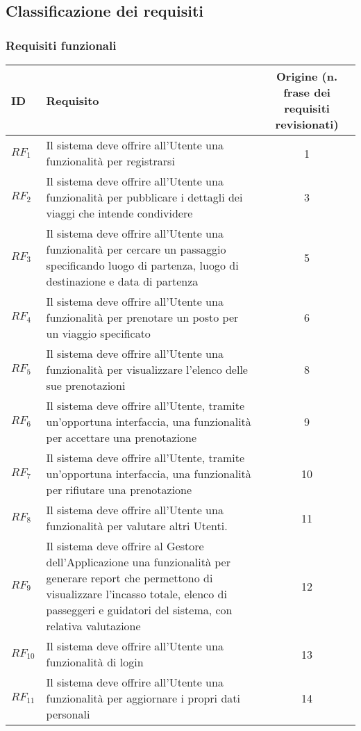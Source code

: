 \subsection{Classificazione dei requisiti}

\subsubsection{Requisiti funzionali}

\begin{tabularx}{\textwidth}{|A|X|C|}
\hline
ID & Requisito & Origine (n. frase dei requisiti revisionati) \\ \hline
$RF_{1}$ & Il sistema deve offrire all'Utente una funzionalità per registrarsi & 1 \\ \hline
$RF_{2}$ & Il sistema deve offrire all'Utente una funzionalità per pubblicare i dettagli dei viaggi che intende condividere & 3 \\ \hline
$RF_{3}$ & Il sistema deve offrire all'Utente una funzionalità per cercare un passaggio specificando luogo di partenza, luogo di destinazione e data di partenza & 5 \\ \hline
$RF_{4}$ & Il sistema deve offrire all'Utente una funzionalità per prenotare un posto per un viaggio specificato & 6 \\ \hline
$RF_{5}$ & Il sistema deve offrire all'Utente una funzionalità per visualizzare l'elenco delle sue prenotazioni & 8 \\ \hline
$RF_6$ & Il sistema deve offrire all'Utente, tramite un'opportuna interfaccia, una funzionalità per accettare una prenotazione & 9 \\ \hline
$RF_7$ & Il sistema deve offrire all'Utente, tramite un'opportuna interfaccia, una funzionalità per rifiutare una prenotazione & 10 \\ \hline
$RF_{8}$ & Il sistema deve offrire all'Utente una funzionalità per valutare altri Utenti. & 11 \\ \hline
$RF_{9}$ & Il sistema deve offrire al Gestore dell'Applicazione una funzionalità per generare report che permettono di visualizzare l'incasso totale, elenco di passeggeri e guidatori del sistema, con relativa valutazione & 12 \\ \hline
$RF_{10}$ & Il sistema deve offrire all'Utente una funzionalità di login & 13 \\ \hline
$RF_{11}$ & Il sistema deve offrire all'Utente una funzionalità per aggiornare i propri dati personali & 14 \\ \hline
\end{tabularx}

